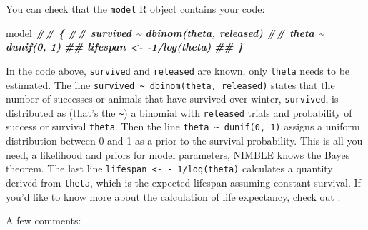 \documentclass[
  12pt,
]{krantz}
\newenvironment{Shaded}{\begin{snugshade}}{\end{snugshade}}
\newcommand{\DocumentationTok}[1]{\textcolor[rgb]{0.56,0.35,0.01}{\textbf{\textit{#1}}}}
\newcommand{\NormalTok}[1]{#1}
\begin{document}
You can check that the \texttt{model} R object contains your code:

\begin{Shaded}
\begin{Highlighting}[]
\NormalTok{model}
\DocumentationTok{\#\# \{}
\DocumentationTok{\#\#     survived \textasciitilde{} dbinom(theta, released)}
\DocumentationTok{\#\#     theta \textasciitilde{} dunif(0, 1)}
\DocumentationTok{\#\#     lifespan \textless{}{-} {-}1/log(theta)}
\DocumentationTok{\#\# \}}
\end{Highlighting}
\end{Shaded}

In the code above, \texttt{survived} and \texttt{released} are known, only \texttt{theta} needs to be estimated. The line \texttt{survived\ \textasciitilde{}\ dbinom(theta,\ released)} states that the number of successes or animals that have survived over winter, \texttt{survived}, is distributed as (that's the \texttt{\textasciitilde{}}) a binomial with \texttt{released} trials and probability of success or survival \texttt{theta}. Then the line \texttt{theta\ \textasciitilde{}\ dunif(0,\ 1)} assigns a uniform distribution between 0 and 1 as a prior to the survival probability. This is all you need, a likelihood and priors for model parameters, NIMBLE knows the Bayes theorem. The last line \texttt{lifespan\ \textless{}-\ -\ 1/log(theta)} calculates a quantity derived from \texttt{theta}, which is the expected lifespan assuming constant survival. If you'd like to know more about the calculation of life expectancy, check out \citet{cook1967expectancy}.

A few comments:
\end{document}
